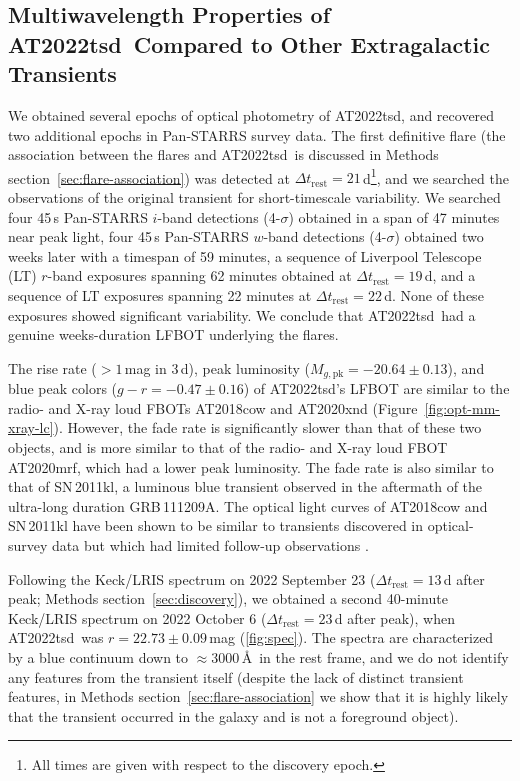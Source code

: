 \documentclass{nature_plusfigure}
\newcommand{\at}{AT2022tsd}
\begin{document}
\begin{methods}
\section{Multiwavelength Properties of \at\ Compared to Other Extragalactic Transients}
\label{sec:multiwavelength-properties}

We obtained several epochs of optical photometry of \at, and recovered two additional epochs in Pan-STARRS survey data.
The first definitive flare (the association between the flares and \at\ is discussed in Methods section~\ref{sec:flare-association}) was detected at $\Delta t_\mathrm{rest}=21$\,d\footnote{All times are given with respect to the discovery epoch.}, and we searched the observations of the original transient for short-timescale variability.
We searched four 45\,s Pan-STARRS $i$-band detections (4-$\sigma$) obtained in a span of 47 minutes near peak light,
four 45\,s Pan-STARRS $w$-band detections (4-$\sigma$) obtained two weeks later with a timespan of 59 minutes,
a sequence of Liverpool Telescope (LT) $r$-band exposures spanning 62 minutes obtained at $\Delta t_\mathrm{rest}=19\,$d,
and a sequence of LT exposures spanning 22 minutes at $\Delta t_\mathrm{rest}=22$\,d.
None of these exposures showed significant variability.
We conclude that \at\ had a genuine weeks-duration LFBOT underlying the flares.

The rise rate ($>1\,$mag in 3\,d), peak luminosity ($M_{g,\mathrm{pk}}=-20.64\pm0.13$), and blue peak colors ($g-r=-0.47\pm0.16$) of \at's LFBOT are similar to the radio- and X-ray loud FBOTs AT2018cow and AT2020xnd (Figure~\ref{fig:opt-mm-xray-lc}). However, the fade rate is significantly slower than that of these two objects, and is more similar to that of the radio- and X-ray loud FBOT AT2020mrf\cite{Yao2022}, which had a lower peak luminosity. The fade rate is also similar to that of SN\,2011kl, a luminous blue transient observed in the aftermath of the ultra-long duration GRB\,111209A\cite{Greiner2015}.
The optical light curves of AT2018cow and SN\,2011kl have been shown to be similar to transients discovered in optical-survey data but which had limited follow-up observations \cite{Arcavi2016,Pursiainen2018,Drout2014}.

Following the Keck/LRIS spectrum on 2022 September 23 ($\Delta t_\mathrm{rest}=13\,$d after peak; Methods section~\ref{sec:discovery}), we obtained a second 40-minute Keck/LRIS spectrum on 2022 October 6 ($\Delta t_\mathrm{rest}=23$\,d after peak), when \at\ was $r=22.73\pm0.09\,$mag (\ref{fig:spec}). 
The spectra are characterized by a blue continuum down to $\approx3000\,$\AA\ in the rest frame, and we do not identify any features from the transient itself (despite the lack of distinct transient features, in Methods section~\ref{sec:flare-association} we show that it is highly likely that the transient occurred in the galaxy and is not a foreground object). 


\end{methods}
\end{document}
